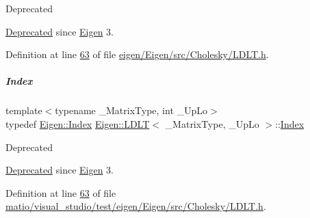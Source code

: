 \begin{DoxyRefDesc}{Deprecated}
\item[\hyperlink{deprecated__deprecated000001}{Deprecated}]since \hyperlink{namespace_eigen}{Eigen} 3. \end{DoxyRefDesc}


Definition at line \hyperlink{eigen_2_eigen_2src_2_cholesky_2_l_d_l_t_8h_source_l00063}{63} of file \hyperlink{eigen_2_eigen_2src_2_cholesky_2_l_d_l_t_8h_source}{eigen/\+Eigen/src/\+Cholesky/\+L\+D\+L\+T.\+h}.

\mbox{\label{group___cholesky___module_ad9c57eb2fb3bbccd51b9d2e111bea355}} 
\subparagraph{\texorpdfstring{Index}{Index}\hspace{0.1cm}{\footnotesize\ttfamily [2/2]}}
{\footnotesize\ttfamily template$<$typename \+\_\+\+Matrix\+Type, int \+\_\+\+Up\+Lo$>$ \\
typedef \hyperlink{namespace_eigen_a62e77e0933482dafde8fe197d9a2cfde}{Eigen\+::\+Index} \hyperlink{group___cholesky___module_class_eigen_1_1_l_d_l_t}{Eigen\+::\+L\+D\+LT}$<$ \+\_\+\+Matrix\+Type, \+\_\+\+Up\+Lo $>$\+::\hyperlink{group___cholesky___module_ad9c57eb2fb3bbccd51b9d2e111bea355}{Index}}

\begin{DoxyRefDesc}{Deprecated}
\item[\hyperlink{deprecated__deprecated000045}{Deprecated}]since \hyperlink{namespace_eigen}{Eigen} 3. \end{DoxyRefDesc}


Definition at line \hyperlink{matio_2visual__studio_2test_2eigen_2_eigen_2src_2_cholesky_2_l_d_l_t_8h_source_l00063}{63} of file \hyperlink{matio_2visual__studio_2test_2eigen_2_eigen_2src_2_cholesky_2_l_d_l_t_8h_source}{matio/visual\+\_\+studio/test/eigen/\+Eigen/src/\+Cholesky/\+L\+D\+L\+T.\+h}.



